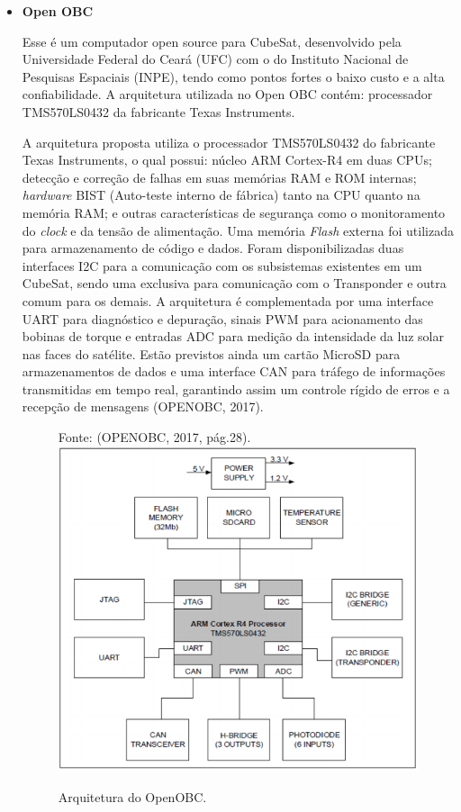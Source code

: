 \begin{itemize}
	\item \textbf{Open OBC}
	
	Esse é um computador open source para CubeSat, desenvolvido pela Universidade Federal do Ceará (UFC) com o do Instituto Nacional de Pesquisas Espaciais (INPE), tendo como pontos fortes o baixo custo e a alta confiabilidade. A arquitetura utilizada no Open OBC  contém: processador TMS570LS0432 da fabricante Texas Instruments.
	
	A arquitetura proposta utiliza o processador TMS570LS0432 do fabricante Texas Instruments, o qual possui: núcleo ARM Cortex-R4 em duas CPUs; detecção e correção de falhas em suas memórias RAM e ROM internas; \textit{hardware} BIST (Auto-teste interno de fábrica) tanto na CPU quanto na memória RAM; e outras características de segurança como o monitoramento do \textit{clock} e da tensão de alimentação. Uma memória \textit{Flash} externa foi utilizada para armazenamento de código e dados. Foram disponibilizadas duas interfaces I2C para a comunicação com os subsistemas existentes em um CubeSat, sendo uma exclusiva para comunicação com o Transponder e outra comum para os demais. A arquitetura é complementada por uma interface UART para diagnóstico e depuração, sinais PWM para acionamento das bobinas de torque e entradas ADC para medição da intensidade da luz solar nas faces do satélite. Estão previstos ainda um cartão MicroSD para armazenamentos de dados e uma interface CAN para tráfego de informações transmitidas em tempo real, garantindo assim um controle rígido de erros e a recepção de mensagens (OPENOBC, 2017).
	
	\begin{figure}[h]
	\footnotesize{
		\centering
		
		Fonte: (OPENOBC, 2017, pág.28). \linebreak
		\includegraphics[keepaspectratio=true,scale=0.4]{figuras/openObc.PNG}
		\caption{Arquitetura do OpenOBC.}
		\label{fig13}
	}
	\end{figure}
	\FloatBarrier
	

\end{itemize}
